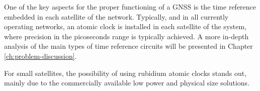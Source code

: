 





One of the key aspects for the proper functioning of a GNSS is the time reference embedded in each satellite of the network. Typically, and in all currently operating networks, an atomic clock is installed in each satellite of the system, where precision in the picoseconds range is typically achieved. A more in-depth analysis of the main types of time reference circuits will be presented in Chapter \autoref{ch:problem-discussion}.

For small satellites, the possibility of using rubidium atomic clocks stands out, mainly due to the commercially available low power and physical size solutions.

